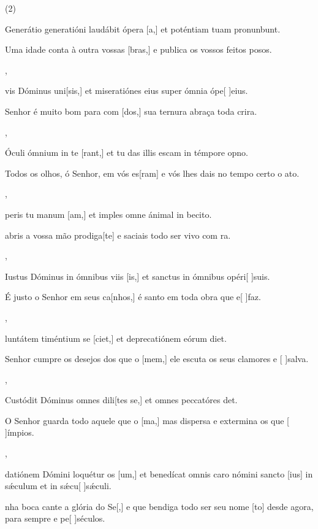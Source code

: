 \SetVersePairs(2){
  {\item {}Generátio generatióni laudábit ópera [a,] et poténtiam tuam pronunbunt.~\Responsorium}%
    {\item {}Uma idade conta à outra vossas [bras,] e publica os vossos feitos posos.~\Responsorium},
  {\item {}vis Dóminus uni[sis,] et miseratiónes eius super ómnia ópe[ ]{e}ius.~\Responsorium}%
    {\item {} Senhor é muito bom para com [dos,] sua ternura abraça toda crira.~\Responsorium},
  {\item {}Óculi ómnium in te [rant,] et tu das illis escam in témpore opno.~\Responsorium}%
    {\item {}Todos os olhos, ó Senhor, em vós es[ram] e vós lhes dais no tempo certo o ato.~\Responsorium},
  {\item {}peris tu manum [am,] et imples omne ánimal in be\-ci\-to.~\Responsorium}%
    {\item {} abris a vossa mão prodiga[te] e saciais todo ser vivo com ra.~\Responsorium},
  {\item {}Iustus Dóminus in ómnibus viis [is,] et sanctus in ómnibus opéri[ ]{su}is.~\Responsorium}%
    {\item {}É justo o Senhor em seus ca[nhos,] é santo em toda obra que e[ ]{faz}.~\Responsorium},
  {\item {}luntátem timéntium se [ciet,] et deprecatiónem eórum diet.~\Responsorium}%
    {\item {} Senhor cumpre os desejos dos que o [mem,] ele escuta os seus clamores e [ ]{sal}va.~\Responsorium},
  {\item {}Custódit Dóminus omnes dili[tes se,] et omnes peccatóres det.~\Responsorium}%
    {\item {}O Senhor guarda todo aquele que o [ma,] mas dispersa e extermina os que [ ]{ím}pios.~\Responsorium},
  {\item {}datiónem Dómini loquétur os [um,] et benedícat omnis caro nómini sancto [ius] in sǽculum et in sǽcu[ ]{sǽ}culi.~\Responsorium}%
    {\item {}nha boca cante a glória do Se[,] e que bendiga todo ser seu nome [to] desde agora, para sempre e pe[ ]{sé}culos.~\Responsorium}
}